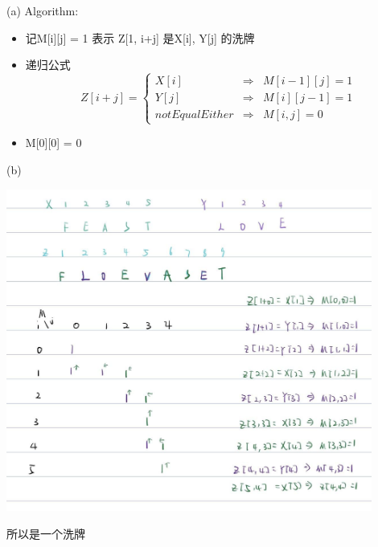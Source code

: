\documentclass[12pt,a4paper]{article}
\begin{document}
\begin{CJK*}{UTF8}{gbsn}
	(a) Algorithm:

	\begin{itemize}
		\item 记M[i][j] = 1 表示 Z[1, i+j] 是X[i], Y[j] 的洗牌
		\item 递归公式 $$
			Z[i+j] = \left\{\begin{array}{lcl}
					X[i] & \Rightarrow & M[i-1][j] = 1\\
					Y[j] & \Rightarrow & M[i][j-1] = 1\\
					not Equal Either& \Rightarrow & M[i,j] = 0
				\end{array}
				$$
			\item M[0][0] = 0
		\end{itemize}

  (b) 

  \includegraphics[width=12cm]{img/answ3.jpg}

	所以是一个洗牌
\end{CJK*}
\end{document}
